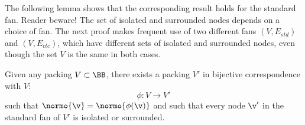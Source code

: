 The following lemma shows that the corresponding result holds for the
standard fan.  Reader beware!  The set of isolated and surrounded
nodes depends on a choice of fan.  The next proof makes frequent use
of two different fans $(V,E_{std})$ and $(V,E_{ctc})$, which have
different sets of isolated and surrounded nodes, even though the
set $V$ is the same in both cases.



\begin{lemma}[]
\label{lemma:surrounded}  %
Given any packing $V\subset \BB$,
there exists a  packing $V'$ 
in bijective correspondence with $V$:
\begin{displaymath}
\phi:V\to V'
\end{displaymath}
such that $\normo{\v} = \normo{\phi(\v)}$ and
such that every node $\v'$ in the standard fan of $V'$
is isolated or surrounded.
%
\end{lemma}

